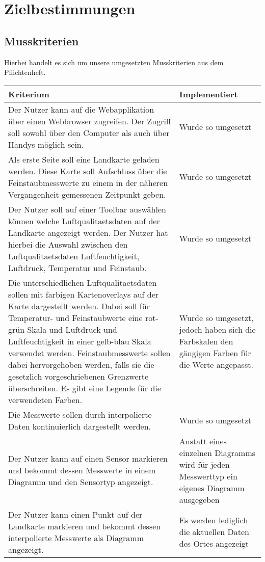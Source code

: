\section{Zielbestimmungen}
\subsection{Musskriterien}
    Hierbei handelt es sich um unsere umgesetzten Musskriterien aus dem Pflichtenheft.
    \begin{tabularx}{\textwidth}{| X | X |}
    \hline
    \textbf{Kriterium} & 
    \textbf{Implementiert}\\
    \hline
    Der Nutzer kann auf die Webapplikation über einen Webbrowser zugreifen. Der Zugriff soll sowohl über den Computer als auch über Handys möglich sein. & Wurde so umgesetzt \\
    \hline
    Als erste Seite soll eine Landkarte geladen werden. Diese Karte soll Aufschluss über die \gls{Feinstaub}messwerte zu einem in der näheren Vergangenheit gemessenen Zeitpunkt geben. & Wurde so umgesetzt \\
    \hline
    Der Nutzer soll auf einer Toolbar auswählen können welche \gls{Luftqualitaetsdaten} auf der Landkarte angezeigt werden. Der Nutzer hat hierbei die Auswahl zwischen den \gls{Luftqualitaetsdaten} Luftfeuchtigkeit, Luftdruck, Temperatur und \gls{Feinstaub}. & Wurde so umgesetzt \\
    \hline
    Die unterschiedlichen \gls{Luftqualitaetsdaten} sollen mit farbigen Kartenoverlays auf der Karte dargestellt werden. Dabei soll für Temperatur- und \gls{Feinstaub}werte eine rot-grün Skala und Luftdruck und Luftfeuchtigkeit in einer gelb-blau Skala verwendet werden. \gls{Feinstaub}messwerte sollen dabei hervorgehoben werden, falls sie die gesetzlich vorgeschriebenen Grenzwerte überschreiten.
    Es gibt eine Legende für die verwendeten Farben. & Wurde so umgesetzt, jedoch haben sich die Farbskalen den gängigen Farben für die Werte angepasst. \\
    \hline
    Die Messwerte sollen durch interpolierte Daten kontinuierlich dargestellt werden. & Wurde so umgesetzt \\
    \hline
    Der Nutzer kann auf einen Sensor markieren und bekommt dessen Messwerte in einem Diagramm und den Sensortyp angezeigt. & Anstatt eines einzelnen Diagramms wird für jeden Messwerttyp ein eigenes Diagramm ausgegeben \\
    \hline
    Der Nutzer kann einen Punkt auf der Landkarte markieren und bekommt dessen interpolierte Messwerte als Diagramm angezeigt. & Es werden lediglich die aktuellen Daten des Ortes angezeigt \\

\end{tabularx}
